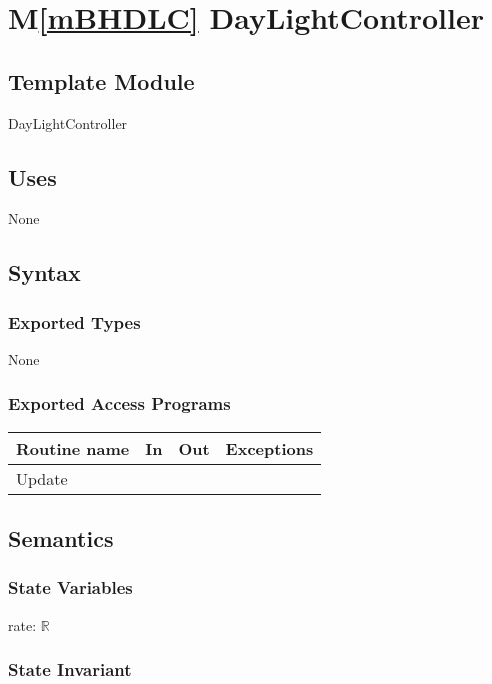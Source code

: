 \documentclass[12pt]{article}
\newcommand{\mref}[1]{M\ref{#1}}
\begin{document}
\newpage

{\color {magenta} 
\section* {\mref{mBHDLC} DayLightController}

\subsection*{Template Module}

DayLightController

\subsection* {Uses}

None

\subsection* {Syntax}

\subsubsection* {Exported Types}

None

\subsubsection* {Exported Access Programs}

\begin{tabular}{| l | l | l | l |}
\hline
\textbf{Routine name} & \textbf{In} & \textbf{Out} & \textbf{Exceptions}\\
\hline
Update & ~ & ~ & ~\\
\hline
\end{tabular}

\subsection* {Semantics}

\subsubsection* {State Variables}

rate: $\mathbb{R}$ \\

\subsubsection* {State Invariant}

}
\end{document}
